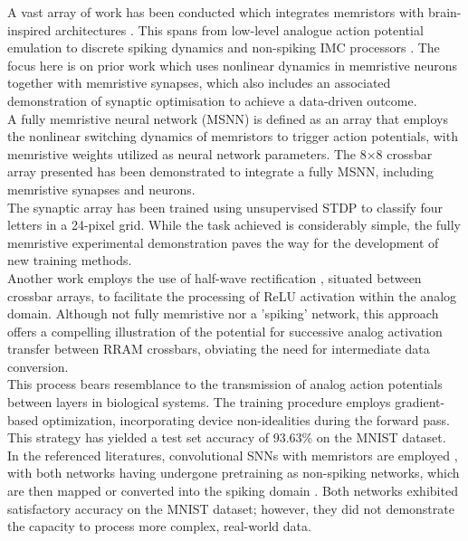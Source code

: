 \noindent A vast array of work has been conducted which integrates memristors with brain-inspired architectures \cite{kang2021build}. This spans from low-level analogue action potential emulation to discrete spiking dynamics and non-spiking IMC processors \cite{eshraghian2022memristor}. The focus here is on prior work which uses nonlinear dynamics in memristive neurons together with memristive synapses, which also includes an associated demonstration of synaptic optimisation to achieve a data-driven outcome. \\

\noindent A fully memristive neural network (MSNN) is defined as an array that employs the nonlinear switching dynamics of memristors to trigger action potentials, with memristive weights utilized as neural network parameters. The 8×8 crossbar array presented \cite{wang2018fully} has been demonstrated to integrate a fully MSNN, including memristive synapses and neurons. \\

\noindent The synaptic array has been trained using unsupervised STDP to classify four letters in a 24-pixel grid. While the task achieved is considerably simple, the fully memristive experimental demonstration paves the way for the development of new training methods. \\

\noindent Another work employs the use of half-wave rectification \cite{kiani2021fully}, situated between crossbar arrays, to facilitate the processing of ReLU activation within the analog domain. Although not fully memristive nor a 'spiking' network, this approach offers a compelling illustration of the potential for successive analog activation transfer between RRAM crossbars, obviating the need for intermediate data conversion.\\

\noindent This process bears resemblance to the transmission of analog action potentials between layers in biological systems. The training procedure employs gradient-based optimization, incorporating device non-idealities during the forward pass. This strategy has yielded a test set accuracy of 93.63\% on the MNIST dataset. \\

\noindent In the referenced literatures, convolutional SNNs with memristors are employed \cite{wang2018handwritten}, with both networks having undergone pretraining as non-spiking networks, which are then mapped or converted into the spiking domain \cite{wijesinghe2018all}. Both networks exhibited satisfactory accuracy on the MNIST dataset; however, they did not demonstrate the capacity to process more complex, real-world data.\\ 

